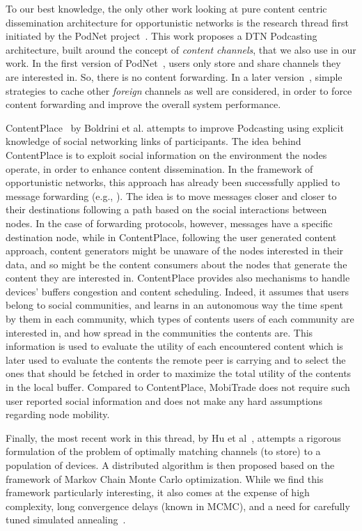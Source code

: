 To our best knowledge, the only other work looking at pure content centric dissemination architecture for opportunistic networks is the research thread first initiated by the PodNet project~\cite{May07wirelessopportunistic, podnet07}. This work proposes a DTN Podcasting architecture, built around the concept of \emph{content channels}, that we also use in our work. In the first version of PodNet~\cite{May07wirelessopportunistic}, users only store and share channels they are interested in. So, there is no content forwarding. In a later version~\cite{podnet07}, simple strategies to cache other \emph{foreign} channels as well are considered, in order to force content forwarding and  improve the overall system performance. 
 
ContentPlace~\cite{ContentPlace} by Boldrini et al. attempts to improve Podcasting using explicit knowledge of social networking links of participants. The idea behind ContentPlace is to exploit social information on the environment the nodes operate, in order to enhance content dissemination. In the framework of opportunistic networks, this approach has already been successfully applied to message forwarding (e.g., \cite{Boldrini:SocialForwarding}). The idea is to
move messages closer and closer to their destinations following a path based on the social interactions between nodes. In the case of forwarding protocols, however, messages have a specific destination node, while in ContentPlace, following the user generated content 
approach, content generators might be unaware of the nodes interested in their data, and so might be the content consumers about the
nodes that generate the content they are interested in. ContentPlace provides also mechanisms to handle devices' buffers congestion and content scheduling. Indeed, it assumes that users belong to social communities, and learns in an autonomous way the time
spent by them in each community, which types of contents users of each community are interested in, and how
spread in the communities the contents are. This information is used to evaluate the utility of each encountered
content which is later used to evaluate the contents the remote peer is carrying and to select the ones that should be fetched in order to maximize the total utility of the 
contents in the local buffer. Compared to ContentPlace, MobiTrade does not require such user reported social information and does not make any hard assumptions regarding node mobility. 
 
Finally, the most recent work in this thread, by Hu et al~\cite{OptimalChannelChoice}, attempts a rigorous formulation of the problem of optimally matching channels (to store) to a population of devices. A distributed algorithm is then proposed based on the framework of Markov Chain Monte Carlo optimization. While we find this framework particularly interesting, it also comes at the expense of high complexity, long convergence delays (known in MCMC), and a need for carefully tuned simulated annealing~\cite{mcmc-bremaud}.

